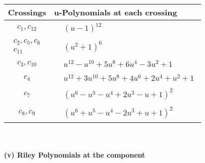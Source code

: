 \documentclass[1p]{elsarticle_modified}
\theoremstyle{definition}
\begin{document}
\begin{tabular}{m{50pt}|m{274pt}}
Crossings & \hspace{64pt}u-Polynomials at each crossing \\
\hline $$\begin{aligned}c_{1},c_{12}\end{aligned}$$&$\begin{aligned}
&(u-1)^{12}
\end{aligned}$\\
\hline $$\begin{aligned}c_{2},c_{5},c_{6}\\c_{11}\end{aligned}$$&$\begin{aligned}
&(u^2+1)^6
\end{aligned}$\\
\hline $$\begin{aligned}c_{3},c_{10}\end{aligned}$$&$\begin{aligned}
&u^{12}- u^{10}+5 u^8+6 u^4-3 u^2+1
\end{aligned}$\\
\hline $$\begin{aligned}c_{4}\end{aligned}$$&$\begin{aligned}
&u^{12}+3 u^{10}+5 u^8+4 u^6+2 u^4+u^2+1
\end{aligned}$\\
\hline $$\begin{aligned}c_{7}\end{aligned}$$&$\begin{aligned}
&(u^6- u^5- u^4+2 u^3- u+1)^2
\end{aligned}$\\
\hline $$\begin{aligned}c_{8},c_{9}\end{aligned}$$&$\begin{aligned}
&(u^6+u^5- u^4-2 u^3+u+1)^2
\end{aligned}$\\
\hline
\end{tabular}\\~\\
\newpage\renewcommand{\arraystretch}{1}
\flushleft \textbf{(v) Riley Polynomials at the component}\newline \\
\end{document}

